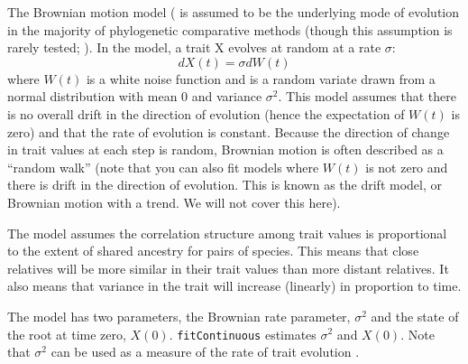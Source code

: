 \documentclass[11pt]{article}
\begin{document}
The Brownian motion model (\citep{cavalli1967phylogenetic,felsenstein1973maximum} is assumed to be the underlying mode of evolution in the majority of phylogenetic comparative methods (though this assumption is rarely tested; \citealt{freckleton2006detecting}). In the model, a trait X evolves at random at a rate $\sigma$:
\begin{equation}
dX(t) = \sigma dW(t)
\end{equation}
where $W(t)$ is a white noise function and is a random variate drawn from a normal distribution with mean $0$ and variance $\sigma^2$. This model assumes that there is no overall drift in the direction of evolution (hence the expectation of $W(t)$ is zero) and that the rate of evolution is constant. Because the direction of change in trait values at each step is random, Brownian motion is often described as a ``random walk'' (note that you can also fit models where $W(t)$ is not zero and there is drift in the direction of evolution. This is known as the drift model, or Brownian motion with a trend. We will not cover this here).


The model assumes the correlation structure among trait values is proportional to the extent of shared ancestry for pairs of species. This means that close relatives will be more similar in their trait values than more distant relatives. It also means that variance in the trait will increase (linearly) in proportion to time. 

The model has two parameters, the Brownian rate parameter, $\sigma^2$ and the state of the root at time zero, $X(0)$. \texttt{fitContinuous} estimates $\sigma^2$ and $X(0)$. Note that $\sigma^2$ can be used as a measure of the rate of trait evolution \citep{cooper2010body,cooper2011phylogenetic}. 
\end{document}
